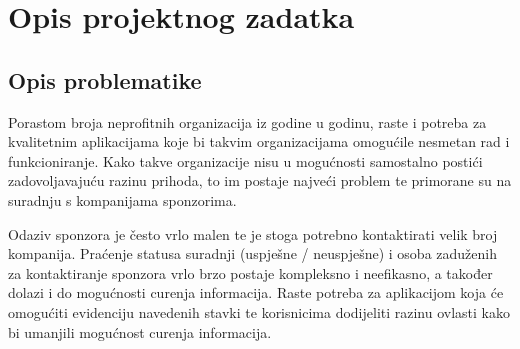 \chapter{Opis projektnog zadatka}

%
		
		\section{Opis problematike}
		
		{Porastom broja neprofitnih organizacija iz godine u godinu, raste i potreba za kvalitetnim aplikacijama koje bi takvim organizacijama omogućile nesmetan rad i funkcioniranje. Kako takve organizacije nisu u mogućnosti samostalno postići zadovoljavajuću razinu prihoda, to im postaje najveći problem te primorane su na suradnju s kompanijama sponzorima.}\vspace{0.3cm}

		{Odaziv sponzora je često vrlo malen te je stoga potrebno kontaktirati velik broj kompanija. Praćenje statusa suradnji (uspješne / neuspješne) i osoba zaduženih za kontaktiranje sponzora vrlo brzo postaje kompleksno i neefikasno, a također dolazi i do mogućnosti curenja informacija. Raste potreba za aplikacijom koja će omogućiti evidenciju navedenih stavki te korisnicima dodijeliti razinu ovlasti kako bi umanjili mogućnost curenja informacija.}
		
